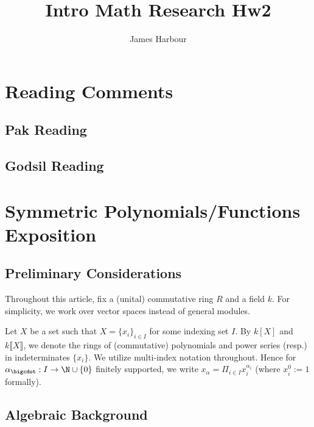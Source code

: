 \documentclass[12pt]{article}
\title{Intro Math Research Hw2}
\author{James Harbour}
\begin{document}
\maketitle
\tableofcontents


\section{Reading Comments}

\subsection*{Pak Reading}


\subsection*{Godsil Reading}


\newpage

\section{Symmetric Polynomials/Functions Exposition}


\subsection*{Preliminary Considerations} 
Throughout this article, fix a (unital) commutative ring $ R $ and a field $ k $. For simplicity, we work over vector spaces instead of general modules.

\begin{notation*}
  Let $ X $ be a set such that $ X = \{x_{i}\}_{i\in I} $ for some indexing set $ I $. By $ k[X] $ and $ k\llbracket X \rrbracket $, we denote the rings of (commutative) polynomials and power series (resp.) in indeterminates $ \{x_{i}\} $. We utilize multi-index notation throughout. Hence for $ \alpha_{\bigcdot}:I\to \N\cup\{0\} $ finitely supported, we write $ x_{\alpha} = \Pi_{i\in I}x_{i}^{\alpha_{i}} $ (where $ x_{i}^0 := 1 $ formally).
\end{notation*}

\subsection{Algebraic Background}
\end{document}
